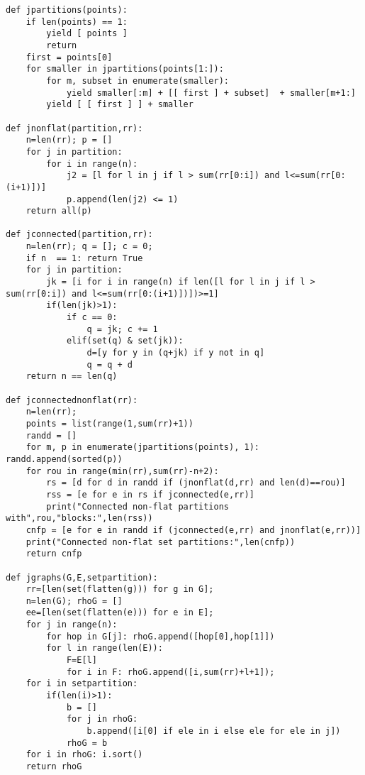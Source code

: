 \documentclass[12pt]{article}
\numberwithin{equation}{section}
\begin{document}
\begin{lstlisting}
def jpartitions(points):
    if len(points) == 1:
        yield [ points ]
        return
    first = points[0]
    for smaller in jpartitions(points[1:]):
        for m, subset in enumerate(smaller):
            yield smaller[:m] + [[ first ] + subset]  + smaller[m+1:]
        yield [ [ first ] ] + smaller

def jnonflat(partition,rr):
    n=len(rr); p = []
    for j in partition:    
        for i in range(n):
            j2 = [l for l in j if l > sum(rr[0:i]) and l<=sum(rr[0:(i+1)])]
            p.append(len(j2) <= 1)
    return all(p)

def jconnected(partition,rr):
    n=len(rr); q = []; c = 0; 
    if n  == 1: return True
    for j in partition:
        jk = [i for i in range(n) if len([l for l in j if l > sum(rr[0:i]) and l<=sum(rr[0:(i+1)])])>=1]
        if(len(jk)>1):            
            if c == 0:
                q = jk; c += 1
            elif(set(q) & set(jk)):
                d=[y for y in (q+jk) if y not in q]
                q = q + d
    return n == len(q)

def jconnectednonflat(rr):
    n=len(rr); 
    points = list(range(1,sum(rr)+1))
    randd = []
    for m, p in enumerate(jpartitions(points), 1): randd.append(sorted(p))
    for rou in range(min(rr),sum(rr)-n+2):    
        rs = [d for d in randd if (jnonflat(d,rr) and len(d)==rou)]
        rss = [e for e in rs if jconnected(e,rr)]
        print("Connected non-flat partitions with",rou,"blocks:",len(rss))
    cnfp = [e for e in randd if (jconnected(e,rr) and jnonflat(e,rr))]
    print("Connected non-flat set partitions:",len(cnfp))
    return cnfp

def jgraphs(G,E,setpartition):
    rr=[len(set(flatten(g))) for g in G];
    n=len(G); rhoG = []
    ee=[len(set(flatten(e))) for e in E];
    for j in range(n):
        for hop in G[j]: rhoG.append([hop[0],hop[1]])
        for l in range(len(E)):
            F=E[l]
            for i in F: rhoG.append([i,sum(rr)+l+1]);
    for i in setpartition:
        if(len(i)>1):
            b = []
            for j in rhoG:
                b.append([i[0] if ele in i else ele for ele in j])
            rhoG = b
    for i in rhoG: i.sort()
    return rhoG


\end{lstlisting}
\end{document}
